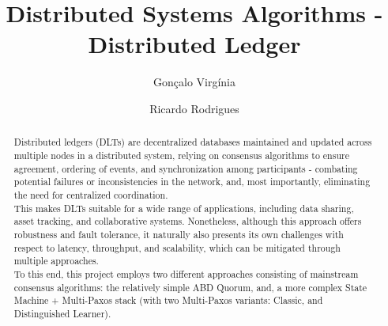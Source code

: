 \documentclass[sigconf]{acmart}
\begin{document}
\title{Distributed Systems Algorithms - Distributed Ledger}

\author{Gonçalo Virgínia}

\author{Ricardo Rodrigues}

\renewcommand{\shortauthors}{G. Virgínia, R. Rodrigues}

\begin{abstract}
    Distributed ledgers (DLTs) are decentralized databases maintained and updated across multiple nodes in a distributed system, relying on consensus algorithms to ensure agreement, ordering of events, and synchronization among participants - combating potential failures or inconsistencies in the network, and, most importantly, eliminating the need for centralized coordination. \\
    This makes DLTs suitable for a wide range of applications, including data sharing, asset tracking, and collaborative systems. Nonetheless, although this approach offers robustness and fault tolerance, it naturally also presents its own challenges with respect to latency, throughput, and scalability, which can be mitigated through multiple approaches. \\
    To this end, this project employs two different approaches consisting of mainstream consensus algorithms: the relatively simple ABD Quorum, and, a more complex State Machine + Multi-Paxos stack (with two Multi-Paxos variants: Classic, and Distinguished Learner). \\
\end{abstract}
\end{document}
